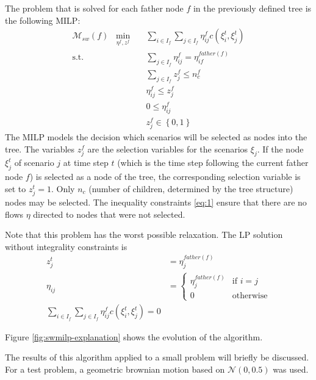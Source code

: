 The problem that is solved for each father node $f$ in the previously defined tree is the following MILP:
\begin{subequations}
\begin{eqnarray} %
  \label{eq:small-milp-in-alg}
  \mathcal{M}_{sw}(f)\; \; \min_{\eta^f,z^f}&&\sum_{i\in I_f}\sum_{j\in I_f}\eta_{ij}^fc(\xi_i^t,\xi_j^t)\\
  \mathrm{s.t.}&&\sum_{j\in I_f}\eta_{ij}^f = \eta_{if}^{father(f)}\\
  \label{eq:75}
  &&\sum_{j\in I_f}z_j^f \leq n_c^f\\
  \label{eq:1}
  &&\eta_{ij}^f\leq z_j^f\\
  &&0\leq \eta_{ij}^f\\
  &&z_j^f\in\left\{0,1\right\}
\end{eqnarray}
\end{subequations}
The MILP models the decision which scenarios will be selected as nodes into the tree.
The variables $z_j^f$ are the selection variables for the scenarios $\xi_j$.
If the node $\xi_j^t$ of scenario $j$ at time step $t$ (which is the time step following the current father node $f$) is selected as a node of the tree, the corresponding selection variable is set to $z_j^t=1$.
Only $n_c$ (number of children, determined by the tree structure) nodes may be selected.
The inequality constraints \eqref{eq:1} ensure that there are no flows $\eta$ directed to nodes that were not selected.

Note that this problem has the worst possible relaxation. The LP solution without integrality constraints is
\begin{align}
  \label{eq:2}
  z_j^t &= \eta_j^{father(f)}\\
  \eta_{ij} &= \left\{
    \begin{array}{ll}
      \eta_j^{father(f)}&\text{if } i=j\\
      0&\text{otherwise}
    \end{array}
  \right.\\
  \sum_{i\in I_f}\sum_{j\in I_f}\eta_{ij}^fc(\xi_i^t,\xi_j^t) = 0
\end{align}

Figure \ref{fig:swmilp-explanation} shows the evolution of the algorithm.

The results of this algorithm applied to a small problem will briefly be discussed.
For a test problem, a geometric brownian motion based on $\mathcal{N}(0,0.5)$ was used.

